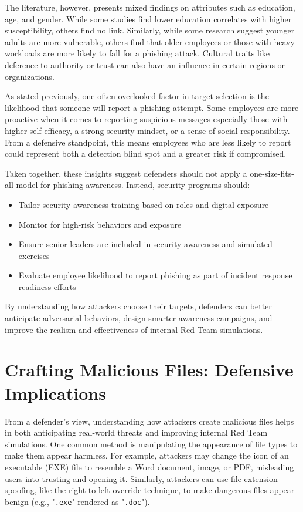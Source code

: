 The literature, however, presents mixed findings on attributes such as education, age, and gender. While some studies find lower education correlates with higher susceptibility, others find no link. Similarly, while some research suggest younger adults are more vulnerable, others find that older employees or those with heavy workloads are more likely to fall for a phishing attack. Cultural traits like deference to authority or trust can also have an influence in certain regions or organizations.

As stated previously, one often overlooked factor in target selection is the likelihood that someone will report a phishing attempt. Some employees are more proactive when it comes to reporting suspicious messages-especially those with higher self-efficacy, a strong security mindset, or a sense of social responsibility. From a defensive standpoint, this means employees who are less likely to report could represent both a detection blind spot and a greater risk if compromised.

Taken together, these insights suggest defenders should not apply a one-size-fits-all model for phishing awareness. Instead, security programs should:
\begin{itemize}
    \item Tailor security awareness training based on roles and digital exposure
    \item Monitor for high-risk behaviors and exposure
    \item Ensure senior leaders are included in security awareness and simulated exercises
    \item Evaluate employee likelihood to report phishing as part of incident response readiness efforts
\end{itemize}

By understanding how attackers choose their targets, defenders can better anticipate adversarial behaviors, design smarter awareness campaigns, and improve the realism and effectiveness of internal Red Team simulations.

\section{Crafting Malicious Files: Defensive Implications}
From a defender's view, understanding how attackers create malicious files helps in both anticipating real-world threats and improving internal Red Team simulations. One common method is manipulating the appearance of file types to make them appear harmless. For example, attackers may change the icon of an executable (EXE) file to resemble a Word document, image, or PDF, misleading users into trusting and opening it. Similarly, attackers can use file extension spoofing, like the right-to-left override technique, to make dangerous files appear benign (e.g., "\texttt{.exe}" rendered as "\texttt{.doc}").

